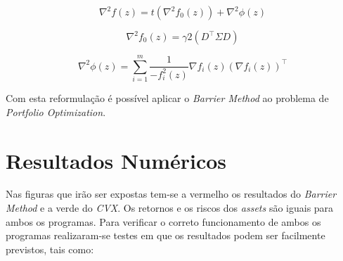 \documentclass[a4paper]{IEEEtran}
\begin{document}
\begin{equation}
\label{eq.hess}
\nabla^2 f(z) = t (\nabla^2 f_0(z)) + \nabla^2 \phi (z)
\end{equation}

\begin{equation}
\label{eq.hesss}
\nabla^2 f_0 (z) = \gamma 2 (D^\top \Sigma D) 
\end{equation}

\begin{equation}
\label{eq.hessss}
\nabla^2 \phi (z) = \sum_{i=1}^{m} \frac{1}{-f_i^2 (z)} \nabla f_i (z) (\nabla f_i (z))^\top
\end{equation}

Com esta reformulação é possível aplicar o \textit{Barrier Method} ao problema de \textit{Portfolio Optimization}.

\section{Resultados Numéricos}
\label{sec:numerical-results}

Nas figuras que irão ser expostas tem-se a vermelho os resultados do \textit{Barrier Method} e a verde do \textit{CVX}.  Os retornos e os riscos dos \textit{assets} são iguais para ambos os programas.
Para verificar o correto funcionamento de ambos os programas realizaram-se testes em que os resultados podem ser facilmente previstos, tais como:
\end{document}
